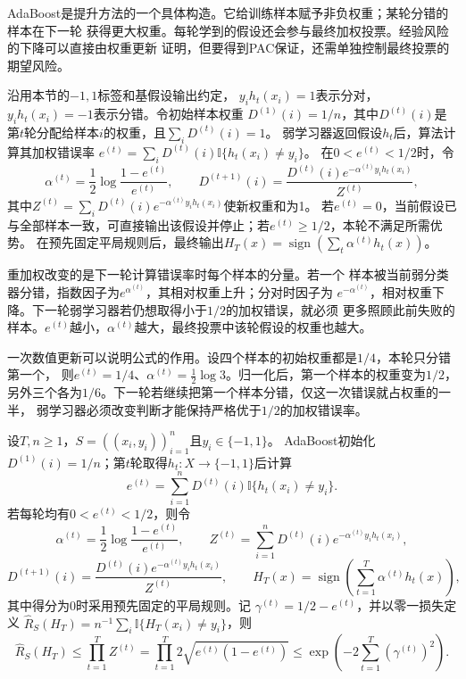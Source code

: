 AdaBoost是提升方法的一个具体构造。它给训练样本赋予非负权重；某轮分错的样本在下一轮
获得更大权重。每轮学到的假设还会参与最终加权投票。经验风险的下降可以直接由权重更新
证明，但要得到PAC保证，还需单独控制最终投票的期望风险。

沿用本节的$-1,1$标签和基假设输出约定，
$y_i h_t(x_i)=1$表示分对，$y_i h_t(x_i)=-1$表示分错。令初始样本权重
$D^{(1)}(i)=1/n$，其中$D^{(t)}(i)$是第$t$轮分配给样本$i$的权重，且$\sum_iD^{(t)}(i)=1$。
弱学习器返回假设$h_t$后，算法计算其加权错误率
$e^{(t)}=\sum_iD^{(t)}(i)\mathbb I\{h_t(x_i)\neq y_i\}$。
在$0<e^{(t)}<1/2$时，令
\begin{equation}
 \alpha^{(t)}=\frac12\log\frac{1-e^{(t)}}{e^{(t)}},\qquad
 D^{(t+1)}(i)=\frac{D^{(t)}(i)e^{-\alpha^{(t)} y_i h_t(x_i)}}{Z^{(t)}},
 \label{eq:adaboost-update}
\end{equation}
其中$Z^{(t)}=\sum_iD^{(t)}(i)e^{-\alpha^{(t)} y_i h_t(x_i)}$使新权重和为1。
若$e^{(t)}=0$，当前假设已与全部样本一致，可直接输出该假设并停止；若$e^{(t)}\geq1/2$，本轮不满足所需优势。
在预先固定平局规则后，最终输出$H_T(x)=\operatorname{sign}(\sum_t\alpha^{(t)} h_t(x))$。

重加权改变的是下一轮计算错误率时每个样本的分量。若一个
样本被当前弱分类器分错，指数因子为$e^{\alpha^{(t)}}$，其相对权重上升；分对时因子为
$e^{-\alpha^{(t)}}$，相对权重下降。下一轮弱学习器若仍想取得小于$1/2$的加权错误，就必须
更多照顾此前失败的样本。$e^{(t)}$越小，$\alpha^{(t)}$越大，最终投票中该轮假设的权重也越大。

一次数值更新可以说明公式的作用。设四个样本的初始权重都是$1/4$，本轮只分错第一个，
则$e^{(t)}=1/4$、$\alpha^{(t)}=\tfrac12\log3$。归一化后，第一个样本的权重变为$1/2$，
另外三个各为$1/6$。下一轮若继续把第一个样本分错，仅这一次错误就占权重的一半，
弱学习器必须改变判断才能保持严格优于$1/2$的加权错误率。

\begin{theorem}[AdaBoost经验风险界]
\label{thm:adaboost-training-error}
设$T,n\geq1$，$S=((x_i,y_i))_{i=1}^n$且$y_i\in\{-1,1\}$。
AdaBoost初始化$D^{(1)}(i)=1/n$；第$t$轮取得$h_t:X\to\{-1,1\}$后计算
\[
 e^{(t)}=\sum_{i=1}^nD^{(t)}(i)\mathbb I\{h_t(x_i)\neq y_i\}.
\]
若每轮均有$0<e^{(t)}<1/2$，则令
\[
 \alpha^{(t)}=\frac12\log\frac{1-e^{(t)}}{e^{(t)}},\qquad
 Z^{(t)}=\sum_{i=1}^nD^{(t)}(i)e^{-\alpha^{(t)}y_i h_t(x_i)},
\]
\[
 D^{(t+1)}(i)
 =\frac{D^{(t)}(i)e^{-\alpha^{(t)}y_i h_t(x_i)}}{Z^{(t)}},
 \qquad
 H_T(x)=\operatorname{sign}\!\left(\sum_{t=1}^T\alpha^{(t)}h_t(x)\right),
\]
其中得分为0时采用预先固定的平局规则。记
$\gamma^{(t)}=1/2-e^{(t)}$，并以零一损失定义
$\hat R_S(H_T)=n^{-1}\sum_i\mathbb I\{H_T(x_i)\neq y_i\}$，则
\begin{equation}
 \hat R_S(H_T)\leq\prod_{t=1}^T Z^{(t)}
 =\prod_{t=1}^T2\sqrt{e^{(t)}(1-e^{(t)})}
 \leq\exp\left(-2\sum_{t=1}^T(\gamma^{(t)})^2\right).
 \label{eq:adaboost-training-bound}
\end{equation}
\end{theorem}

